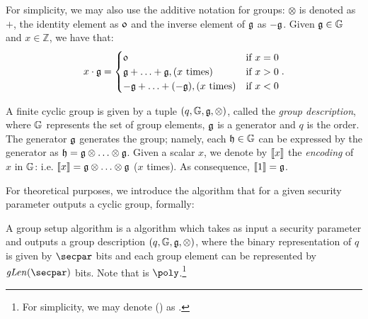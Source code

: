For simplicity, we may also use the additive notation for groups: $\otimes$ is denoted as $+$, the identity element as $\mathfrak{0}$ and the inverse element of $\mathfrak{g}$ as $-\mathfrak{g}$. Given $\mathfrak{g} \in \mathbb{G}$ and $x \in \mathbb{Z}$, we have that:
\[x \cdot \mathfrak{g} =
\begin{cases}
    \mathfrak{0} & \mbox{if } x = 0\\
    \mathfrak{g} + \ldots + \mathfrak{g}, (x \mbox{ times}) & \mbox{if } x > 0 \\
    -\mathfrak{g} + \ldots + (-\mathfrak{g}), (x \mbox{ times}) & \mbox{if } x < 0
\end{cases}.
\]
\begin{definition}
    A finite cyclic group is given by a tuple $(q, \mathbb{G}, \mathfrak{g}, \otimes)$, called the \emph{group description}, where $\mathbb{G}$ represents the set of group elements, $\mathfrak{g}$ is a generator and $q$ is the order. The generator $\mathfrak{g}$ generates the group; namely, each $\mathfrak{h} \in \mathbb{G}$ can be expressed by the generator as $\mathfrak{h} = \mathfrak{g} \otimes \ldots \otimes \mathfrak{g} $.
    Given a scalar $x$, we denote by $\llbracket {x} \rrbracket$ the \emph{encoding} of $x$ in $\mathbb{G}$: i.e. $\llbracket {x} \rrbracket = \mathfrak{g} \otimes \ldots \otimes \mathfrak{g}$ ($x$ times). As consequence, $\llbracket {1} \rrbracket = \mathfrak{g}$.
\end{definition}

For theoretical purposes, we introduce the \groupSetup{} algorithm that for a given security parameter \secpar{} outputs a cyclic group, formally:
\begin{definition}
    A group setup algorithm \groupSetup{} is a \ppt{} algorithm which takes as input a security parameter \secparam{} and outputs a group description $(q, \mathbb{G}, \mathfrak{g}, \otimes)$, where the binary representation of $q$ is given by $\secpar$ bits and each group element can be represented by $\groupLen(\secpar)$ bits. Note that \groupLen{} is $\poly$.\footnote{For simplicity, we may denote \groupLen(\secpar) as \groupLen{}.}
\end{definition}


